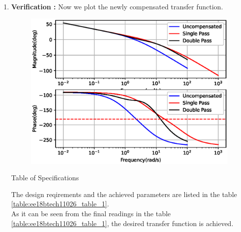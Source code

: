 \begin{enumerate}[label=\thesection.\arabic*.,ref=\thesection.\theenumi]
\item
\textbf{Verification : }
Now we plot the newly compensated transfer function.

\begin{figure}[!ht]
    \centering
    \includegraphics[width=\columnwidth]{./figs/ee18btech11051/ee18btech11051_fig3.eps}
    \label{fig:ee18btech11051_3}
\end{figure}

\begin{table}[!ht]
\centering

\caption{Table of Specifications}
\label{table:ee18btech11026_table_1}
\end{table}

The design reqirements and the achieved parameters are listed in the table \ref{table:ee18btech11026_table_1}.\\As it can be seen from the final readings in the table \ref{table:ee18btech11026_table_1}, the desired transfer function is achieved. 

\end{enumerate}
